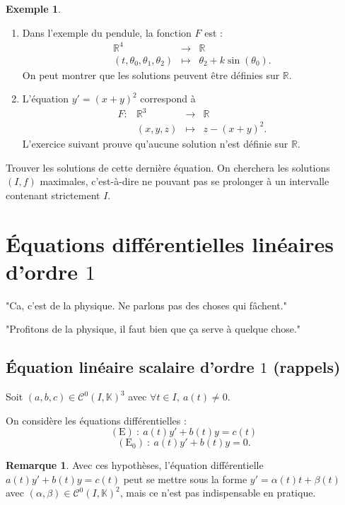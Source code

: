 \documentclass[french]{article}
\newcommand{\R}{\mathbb{R}}
\newcommand{\K}{\mathbb{K}}
\theoremstyle{plain}
\theoremstyle{definition}
\newtheorem*{ex}{Exemple}
\newtheorem*{rmq}{Remarque}
\theoremstyle{remark}
\begin{document}
\begin{ex}
	\begin{enumerate}
		\item Dans l'exemple du pendule, la fonction $F$ est :
		$$\begin{array}{rcl}
			\R^4&\longrightarrow&\R\\
			(t,\theta_0,\theta_1,\theta_2)&\longmapsto&\theta_2+k\sin(\theta_0).
		\end{array}$$
		On peut montrer que les solutions peuvent être définies sur $\R$.
		\item L'équation $y'=(x+y)^2$ correspond à 
		$$\begin{array}{lrcl}
			F:&\R^3&\longrightarrow&\R\\
			&(x,y,z)&\longmapsto& z-(x+y)^2.
		\end{array}$$
		L'exercice suivant prouve qu'aucune solution n'est définie sur $\R$.
	\end{enumerate}
\end{ex}

\begin{exo}
	Trouver les solutions de cette dernière équation. On cherchera les solutions $(I,f)$ maximales, c'est-à-dire ne pouvant pas se prolonger à un intervalle contenant strictement $I$.
\end{exo}

\section{Équations différentielles linéaires d'ordre $1$}

"Ca, c'est de la physique. Ne parlons pas des choses qui fâchent."


"Profitons de la physique, il faut bien que ça serve à quelque chose."

\subsection{Équation linéaire scalaire d'ordre $1$ (rappels)}

Soit $(a,b,c)\in\mathcal{C}^0(I,\K)^3$ avec $\forall t\in I,\ a(t)\ne 0$.

On considère les équations différentielles :
	$$(\text{E})\ :\ a(t)y'+b(t)y=c(t)$$
	$$(\text{E}_0)\ :\ a(t)y'+b(t)y=0.$$

\begin{rmq}
	Avec ces hypothèses, l'équation différentielle $a(t)y'+b(t)y=c(t)$ peut se mettre sous la forme $y'=\alpha(t)t+\beta(t)$ avec $(\alpha,\beta)\in\mathcal{C}^0(I,\K)^2$, mais ce n'est pas indispensable en pratique.
\end{rmq}
\end{document}

